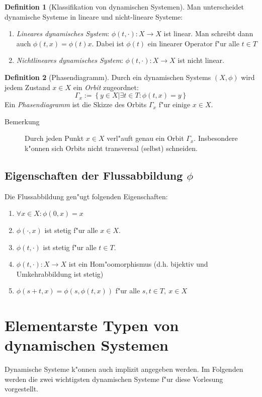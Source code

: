 \documentclass[a4paper, 13pt]{scrreprt}
\theoremstyle{definition} \newtheorem{definition}{Definition}[section]
\begin{document}
\begin{definition}[Klassifikation von dynamischen Systemen]
Man unterscheidet dynamische Systeme in lineare und nicht-lineare Systeme:
\begin{enumerate}
\item \emph{Lineares dynamisches System}: $\phi(t, \cdot)\colon X \to X$ ist linear. Man schreibt dann auch $\phi(t, x) = \phi(t)x$. Dabei ist $\phi(t)$ ein linearer Operator f"ur alle $t\in T$
\item \emph{Nichtlineares dynamisches System}: $\phi(t, \cdot)\colon X \to X$ ist nicht linear.
\end{enumerate}
\end{definition}
\begin{definition}[Phasendiagramm]
Durch ein dynamischen Systems $(X,\phi)$ wird jedem Zustand $x\in X$ ein \emph{Orbit} zugeordnet:
$$\Gamma_x := \left \{\left. y \in X \right | \exists t\in T: \phi(t,x) = y\right \}$$ 
Ein \emph{Phasendiagramm} ist die Skizze des Orbits $\Gamma_x$ f"ur einige $x \in X$.
\begin{description}
\item[Bemerkung]Durch jeden Punkt $x\in X$ verl"auft genau ein Orbit $\Gamma_x$. Insbesondere k"onnen sich Orbits nicht transversal (selbst) schneiden.
\end{description}
\end{definition}
\subsection{Eigenschaften der Flussabbildung $\phi$}
Die Flussabbildung gen"ugt folgenden Eigenschaften:
\begin{enumerate}
\item $\forall x\in X: \phi(0,x) = x$
\item $\phi(\cdot, x)$ ist stetig f"ur alle $x\in X$.
\item $\phi(t, \cdot)$ ist stetig f"ur alle $t\in T$.
\item $\phi(t, \cdot)\colon X \to X$ ist ein Hom"oomorphismus (d.h. bijektiv und Umkehrabbildung ist stetig)
\item $\phi(s+t, x) = \phi\left(s, \phi(t,x)\right)$ f"ur alle $s,t \in T,\  x\in X$
\end{enumerate}

\section{Elementarste Typen von dynamischen Systemen}
Dynamische Systeme k"onnen auch implizit angegeben werden. Im Folgenden werden die zwei wichtigsten dynamischen Systeme f"ur diese Vorlesung vorgestellt.
\end{document}
